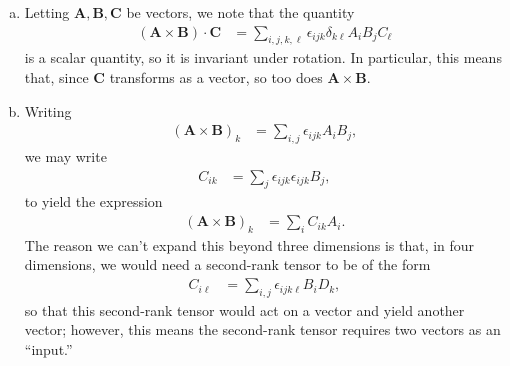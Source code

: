 \documentclass[10pt]{mypackage}
\begin{document}
\begin{solution}[29.24]\hfill
  \begin{enumerate}[(a)]
    \item Letting $\mathbf{A},\mathbf{B},\mathbf{C}$ be vectors, we note that the quantity
    \begin{align*}
      \left( \mathbf{A}\times \mathbf{B} \right)\cdot \mathbf{C} &= \sum_{i,j,k,\ell}\epsilon_{ijk}\delta_{k\ell}A_iB_jC_{\ell}
    \end{align*}
    is a scalar quantity, so it is invariant under rotation. In particular, this means that, since $\mathbf{C}$ transforms as a vector, so too does $\mathbf{A}\times \mathbf{B}$.
    \item Writing
      \begin{align*}
        \left( \mathbf{A}\times \mathbf{B} \right)_{k} &= \sum_{i,j}\epsilon_{ijk}A_iB_j,
      \end{align*}
      we may write
      \begin{align*}
        C_{ik} &= \sum_{j}\epsilon_{ijk}\epsilon_{ijk}B_j,
      \end{align*}
      to yield the expression
      \begin{align*}
        \left( \mathbf{A}\times \mathbf{B} \right)_{k} &= \sum_{i}C_{ik}A_i.
      \end{align*}
      The reason we can't expand this beyond three dimensions is that, in four dimensions, we would need a second-rank tensor to be of the form
      \begin{align*}
        C_{i\ell} &= \sum_{i,j}\epsilon_{ijk\ell}B_iD_{k},
      \end{align*}
      so that this second-rank tensor would act on a vector and yield another vector; however, this means the second-rank tensor requires two vectors as an ``input.''
  \end{enumerate}
\end{solution}
\end{document}
